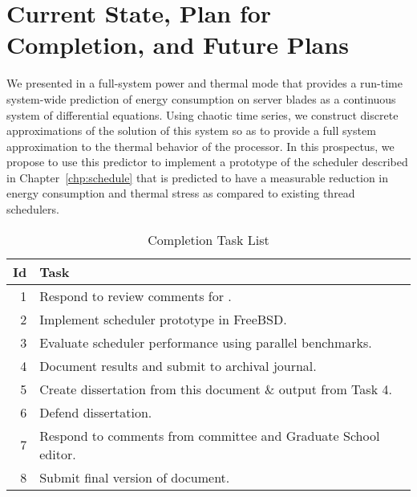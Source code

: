 \chapter{Current State, Plan for Completion, and  Future Plans}
\label{chp:statusandplans}

We presented in  a full-system
power and thermal mode that provides a run-time system-wide prediction
of energy consumption on server blades as a continuous system of
differential equations.  Using chaotic time series, we construct
discrete approximations of the solution of this system so as to provide
a full system approximation to the thermal behavior of the processor.
In this prospectus, we propose to use this predictor to implement a
prototype of the scheduler described in Chapter~\ref{chp:schedule} that
is predicted to have a measurable reduction in energy consumption and
thermal stress as compared to existing thread schedulers.

\begin{table}
\footnotesize
\caption{Completion Task List}
\label{tab:completeplan}
\centering
\begin{tabular}{rl}
Id & Task \\
\hline
\hline
1 & Respond to review comments for \cite{Lewis2011}. \\
2 & Implement scheduler prototype in FreeBSD. \\
3 & Evaluate scheduler performance using parallel benchmarks. \\
4 & Document results and submit to archival journal. \\
5 & Create dissertation from this document \& output from Task 4. \\
6 & Defend dissertation. \\
7 & Respond to comments from committee and Graduate School editor. \\
8 & Submit final version of document. \\
\hline
\end{tabular}
\end{table}
\begin{comment}
#+ORGTBL: SEND completeplan orgtbl-to-latex :splice nil :skip 0
| Id | Task                                                           |
|----+----------------------------------------------------------------|
|----+----------------------------------------------------------------|
|  1 | Respond to review comments for \cite{Lewis2011}.               |
|  2 | Implement scheduler prototype in FreeBSD.                      |
|  3 | Evaluate scheduler performance using parallel benchmarks.      |
|  4 | Document results and submit to archival journal.               |
|  5 | Create dissertation from this document \& output from Task 4.  |
|  6 | Defend dissertation.                                           |
|  7 | Respond to comments from committee and Graduate School editor. |
|  8 | Submit final version of document.                              |
|----+----------------------------------------------------------------|
\end{comment}

